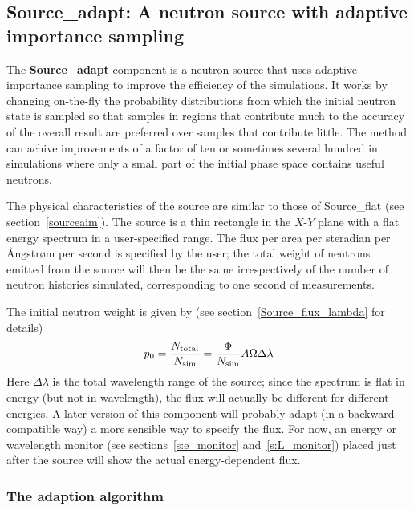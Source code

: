 
\subsection{Source\_adapt: A neutron source with adaptive importance sampling}
\label{s:Source_adapt}
\label{s:source_adapt}

The {\bf Source\_adapt} component is a neutron source that uses adaptive
importance sampling to improve the efficiency of the simulations. It
works by changing on-the-fly the probability distributions from which
the initial neutron state is sampled so that samples in regions that
contribute much to the accuracy of the overall result are preferred over
samples that contribute little. The method can achive improvements of a
factor of ten or sometimes several hundred in simulations where only a
small part of the initial phase space contains useful neutrons.

The physical characteristics of the source are similar to those of
Source\_flat (see section~\ref{sourceaim}). The source is a thin
rectangle in the $X$-$Y$ plane with a flat energy spectrum in a
user-specified range. The flux per area per steradian per
{\AA}ngstr{\o}m per second is specified by the user; the total weight of
neutrons emitted from the source will then be the same irrespectively of
the number of neutron histories simulated, corresponding to one second
of measurements.

The initial neutron weight is given by (see
section~\ref{Source_flux_lambda} for details)
$$ p_0 = \frac{N_{\rm total}}{N_{\rm sim}} = 
    \frac{\Phi}{N_{\rm sim}} A \Omega \Delta\lambda $$
Here $\Delta\lambda$ is the total wavelength range of the source; since
the spectrum is flat in energy (but not in wavelength), the flux
will actually be different for different energies. A later version of
this component will probably adapt (in a backward-compatible way) a more
sensible way to specify the flux. For now, an energy or wavelength
monitor (see sections~\ref{s:e_monitor} and~\ref{s:L_monitor}) placed
just after the source will show the actual energy-dependent flux.


\subsubsection{The adaption algorithm}

